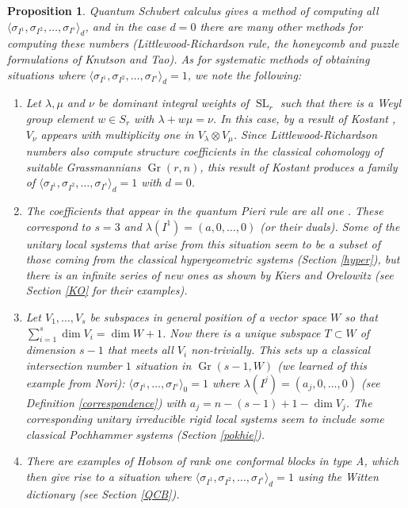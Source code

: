 \documentclass[11pt]{amsart}
\newcommand\op{\operatorname}
\newcommand\tensor{\otimes}
\newcommand\Gr{\operatorname{Gr}}
\newtheorem{proposition}[theorem]{Proposition}
\numberwithin{theorem}{subsection}
\begin{document}
{\begin{proposition}
 Quantum Schubert calculus gives a method of computing all $\langle\sigma_{I^1}, \sigma_{I^2},\dots,\sigma_{I^s}\rangle_d$, and in the case $d=0$ there are many other methods for computing these numbers (Littlewood-Richardson rule, the honeycomb and puzzle formulations of Knutson and Tao). As for systematic methods of obtaining situations where $\langle\sigma_{I^1}, \sigma_{I^2},\dots,\sigma_{I^s}\rangle_d= 1$, we note the following:
\begin{enumerate}
\item Let $\lambda,\mu$ and $\nu$ be dominant integral weights of $\op{SL}_r$ such that there is a Weyl group  element $w\in S_r$ with $\lambda+w\mu=\nu$. In this case, by a result of Kostant \cite[Lemma 4.1]{Kostant}, $V_{\nu}$ appears with multiplicity one in $V_{\lambda}\tensor V_{\mu}$. Since Littlewood-Richardson numbers also compute structure coefficients in the classical cohomology of suitable Grassmannians $\Gr(r,n)$, this result of Kostant produces a family of $\langle\sigma_{I^1}, \sigma_{I^2},\dots,\sigma_{I^s}\rangle_d=1$ with $d=0$.
\item The coefficients that appear in the quantum Pieri rule are all one \cite{bertie}. These correspond to $s=3$ and $\lambda(I^1)=(a,0,\dots,0)$ (or their duals). Some of the unitary local systems that arise from this situation seem to be a subset of  those coming from the classical  hypergeometric systems (Section \ref{hyper}), but there is an infinite series of new ones  as shown by Kiers and Orelowitz (see Section \ref{KO} for their examples).
\item Let $V_1,\dots,V_s$ be  subspaces in general position of a vector space $W$ so that $\sum_{i=1}^s \dim V_i= \dim W+1$. Now there is a unique subspace $T\subset W$ of dimension $s-1$ that meets all $V_i$ non-trivially.
This sets up a classical intersection number $1$ situation in $\Gr(s-1,W)$ (we learned of this example from Nori): $\langle\sigma_{I^1},\dots,\sigma_{I^s}\rangle_0=1$ where $\lambda(I^j)=(a_j,0,\dots,0)$ (see Definition  \ref{correspondence}) with $a_j = n-(s-1) +1-\dim V_j$. The corresponding unitary irreducible rigid local systems seem to include some classical Pochhammer systems (Section \ref{pokhie}).
\item There are examples of Hobson \cite{Hobson} of rank one conformal blocks in type A, which then give rise
to a situation where $\langle\sigma_{I^1}, \sigma_{I^2},\dots,\sigma_{I^s}\rangle_d= 1$ using the Witten dictionary (see Section \ref{QCB}).

\end{enumerate}
\end{proposition}}
\end{document}
